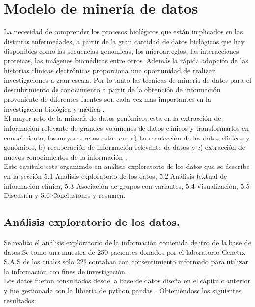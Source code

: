 \chapter{Modelo de minería de datos}

La necesidad de comprender los procesos biológicos que están implicados en las distintas enfermedades, a partir de la gran cantidad de datos biológicos que hay disponibles como las secuencias genómicas, los microarreglos, las interacciones proteicas, las imágenes biomédicas entre otros. Además la rápida adopción de las historias clínicas electrónicas proporciona una oportunidad de realizar investigaciones a gran escala. Por lo tanto las técnicas de minería de datos para el descubrimiento de conocimiento a partir de la obtención de información proveniente de diferentes fuentes son cada vez mas importantes en la investigación biológica y médica \cite{Wang2017}.\\

El mayor reto de la minería de datos genómicos esta en la extracción de información relevante de grandes volúmenes de datos clínicos y transformarlos en conocimiento, los mayores retos están en: a) La recolección de los datos clínicos y genómicos, b) recuperación de información relevante de datos y c) extracción de nuevos conocimientos de la información \cite{Farid2016}. \\  


Este capitulo esta organizado en análisis exploratorio de los datos que se describe en la sección 5.1 Análisis exploratorio de los datos, 5.2 Análisis textual de información clínica, 5.3 Asociación de grupos con variantes, 5.4 Visualización, 5.5 Discusión y 5.6 Conclusiones y resumen. 

\section{Análisis exploratorio de los datos.}

Se realizo el análisis exploratorio de la información contenida dentro de la base de datos.Se tomo una muestra de 250 pacientes donados por el laboratorio Genetix S.A.S de los cuales solo 228 contaban con consentimiento informado para utilizar la información con fines de investigación.\\

Los datos fueron consultados desde la base de datos diseña en el cápitulo anterior y fue gestionada con la librería de python pandas \cite{mckinneypandas}. Obteniéndose los siguientes resultados:

